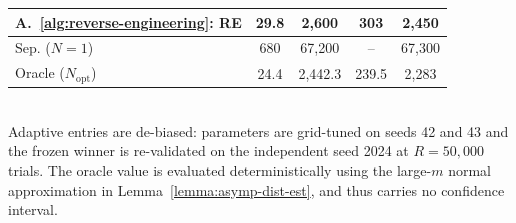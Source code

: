 \begin{table}[ht]
\begin{tabular}{l c c c c}
A.~\ref{alg:reverse-engineering}: RE
& 29.8 \newline {\scriptsize [29.2, 30.3]}
& 2{,}600 \newline {\scriptsize [2{,}570, 2{,}630]}
& 303 \newline {\scriptsize [298, 307]}
& 2{,}450 \newline {\scriptsize [2{,}420, 2{,}480]} \\
\midrule
Sep. ($N=1$)
& 680 \newline {\scriptsize [669, 691]}
& 67{,}200 \newline {\scriptsize [66{,}300, 68{,}300]}
& --
& 67{,}300 \newline {\scriptsize [66{,}300, 68{,}500]} \\
\midrule
Oracle ($N_\text{opt}$)
& 24.4
& 2{,}442.3
& 239.5
& 2{,}283 \\
\bottomrule
\end{tabular}
\\[2pt]
\footnotesize Adaptive entries are de-biased: parameters are grid-tuned on seeds 42 and 43 and the frozen winner is re-validated on the independent seed 2024 at $R=50{,}000$ trials. The oracle value is evaluated deterministically using the large-$m$ normal approximation in Lemma~\ref{lemma:asymp-dist-est}, and thus carries no confidence interval.
\end{table}
